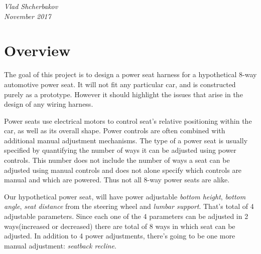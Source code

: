 \documentclass[12pt,letterpaper]{article}
\begin{document}
\begin{titlepage}
	\vfill %
	
	
	\parbox[t]{0.93\textwidth}{ %
		\raggedleft %
		\textit{
		  Vlad Shcherbakov \\
		  November 2017
		}
		
	}

	
\end{titlepage}
\section{Overview}
The goal of this project is to design a power seat harness for a hypothetical 8-way automotive power seat. It will not fit any particular car, and is constructed purely as a prototype. However it should highlight the issues that arise in the design of any wiring harness.

Power seats use electrical motors to control seat’s relative positioning within the car, as well as its overall shape. Power controls are often combined with additional manual adjustment mechanisms. The type of a power seat is usually specified by quantifying the number of ways it can be adjusted using power controls. This number does not include the number of ways a seat can be adjusted using manual controls and does not alone specify which controls are manual and which are powered. Thus not all 8-way power seats are alike.

Our hypothetical power seat, will have power adjustable \textit{bottom height}, \textit{bottom angle}, \textit{seat distance} from the steering wheel and \textit{lumbar support}. That’s total of 4 adjustable parameters. Since each one of the 4 parameters can be adjusted in 2 ways(increased or decreased) there are total of 8 ways in which seat can be adjusted. In addition to 4 power adjustments, there’s going to be one more manual adjustment: \textit{seatback recline}.
\end{document}
